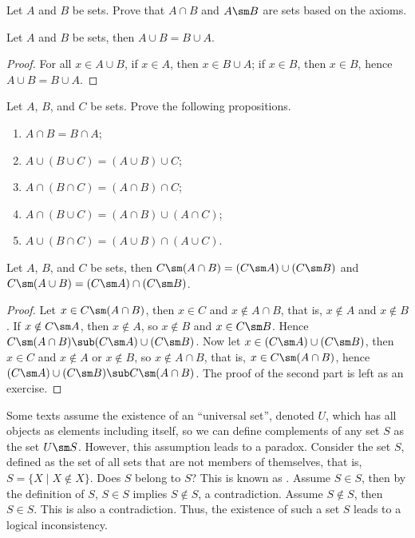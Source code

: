 \documentclass[10pt]{article}
\begin{document}
\begin{problem}
    Let $A$ and $B$ be sets. Prove that $A\cap B$ and $A\sm B$ are sets based on the axioms.
\end{problem}
\begin{proposition}
    Let $A$ and $B$ be sets, then $A\cup B=B\cup A$.
\end{proposition}
\begin{proof}
    For all $x\in A\cup B$, if $x\in A$, then $x\in B\cup A$; if $x\in B$, then $x\in B$, hence $A\cup B=B\cup A$.
\end{proof}
\begin{problem}
    Let $A$, $B$, and $C$ be sets. Prove the following propositions.
    \begin{enumerate}
        \item $A\cap B=B\cap A$;
        \item $A\cup(B\cup C)=(A\cup B)\cup C$;
        \item $A\cap(B\cap C)=(A\cap B)\cap C$;
        \item $A\cap(B\cup C)=(A\cap B)\cup(A\cap C)$;
        \item $A\cup(B\cap C)=(A\cup B)\cap(A\cup C)$.
    \end{enumerate}
\end{problem}
\begin{theorem}
    Let $A$, $B$, and $C$ be sets, then $C\sm(A\cap B)=(C\sm A)\cup(C\sm B)$ and $C\sm(A\cup B)=(C\sm A)\cap(C\sm B)$.
\end{theorem}
\begin{proof}
    Let $x\in C\sm(A\cap B)$, then $x\in C$ and $x\notin A\cap B$, that is, $x\notin A$ and $x\notin B$. If $x\notin C\sm A$, then $x\notin A$, so $x\notin B$ and $x\in C\sm B$. Hence $C\sm(A\cap B)\sub(C\sm A)\cup(C\sm B)$. Now let $x\in(C\sm A)\cup(C\sm B)$, then $x\in C$ and $x\notin A$ or $x\notin B$, so $x\notin A\cap B$, that is, $x\in C\sm(A\cap B)$, hence $(C\sm A)\cup(C\sm B)\sub C\sm(A\cap B)$. The proof of the second part is left as an exercise.
\end{proof}
\par
Some texts assume the existence of an ``universal set'', denoted $U$, which has all objects as elements including itself, so we can define complements of any set $S$ as the set $U\sm S$. However, this assumption leads to a paradox. Consider the set $S$, defined as the set of all sets that are not members of themselves, that is, $S=\{X\mid X\notin X\}$. Does $S$ belong to $S$? This is known as . Assume $S\in S$, then by the definition of $S$, $S\in S$ implies $S\notin S$, a contradiction. Assume $S\notin S$, then $S\in S$. This is also a contradiction. Thus, the existence of such a set $S$ leads to a logical inconsistency.
\end{document}
